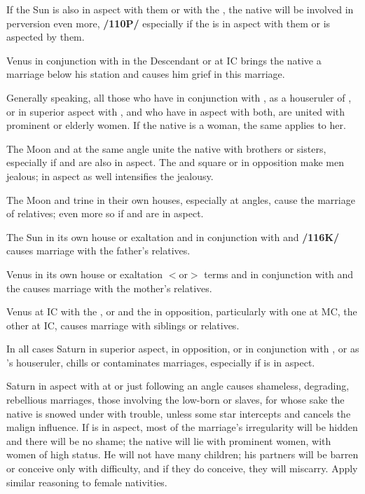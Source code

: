 If the Sun is also in aspect with them or with the \Moon, the native will be involved in perversion even more, \textbf{/110P/} especially if the \Moon\xspace is in aspect with them or is aspected by them. 

Venus in conjunction with \Saturn\xspace in the
Descendant or at IC brings the native a marriage below his station and causes him grief in this marriage. 

Generally speaking, all those who have \Venus\xspace in conjunction with \Saturn, as a houseruler of \Saturn, or in superior aspect with \Saturn, and who have \Jupiter\xspace in aspect with both, are united with prominent or elderly women. If the native is a woman, the same applies to her.

The Moon and \Venus\xspace at the same angle unite the native with brothers or sisters, especially if \Jupiter\xspace
and \Mars\xspace are also in aspect. The \Moon\xspace and \Venus\xspace square or in opposition make men jealous; \Mars\xspace in aspect as well intensifies the jealousy. 

The Moon and \Venus\xspace trine in their own houses, especially at angles, cause the marriage of relatives; even more so if \Mars\xspace and \Jupiter\xspace are in aspect. 

The Sun in its own house or exaltation and in conjunction with \Jupiter\xspace and \Venus\xspace \textbf{/116K/} causes marriage with the father’s relatives. 

Venus in its own house or exaltation $<$or$>$ terms and in conjunction with \Mercury\xspace and the \Moon\xspace
causes marriage with the mother’s relatives. 

Venus at IC with the \Moon, or \Venus\xspace and the \Moon\xspace in opposition, particularly with one at MC, the other at IC, causes marriage with siblings or relatives.

In all cases Saturn in superior aspect, in opposition, or in conjunction with \Venus, or as \Venus’s houseruler, chills or contaminates marriages, especially if \Mercury\xspace is in aspect. 

Saturn in aspect with \Venus\xspace at or just following an angle causes shameless, degrading, rebellious marriages, those involving the low-born or slaves, for whose sake the native is snowed under with trouble, unless some star intercepts and cancels the malign influence. If \Jupiter\xspace is in aspect, most of the marriage’s irregularity will be hidden and there will be no shame; the native will lie with prominent women, with women of high status. He will not have many children; his partners will be barren or conceive only with difficulty, and if they do conceive, they will miscarry. Apply similar reasoning to female nativities.

